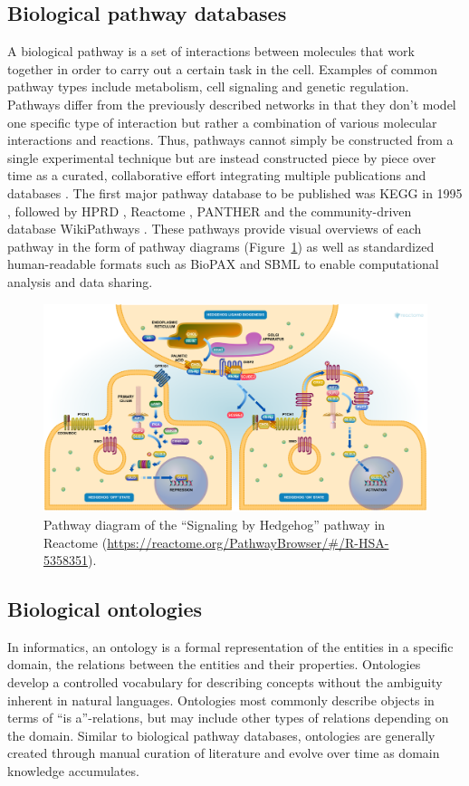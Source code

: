 \subsection{Biological pathway databases}
A biological pathway is a set of interactions between molecules that work together in order to carry out a certain task in the cell. Examples of common pathway types include metabolism, cell signaling and genetic regulation. Pathways differ from the previously described networks in that they don't model one specific type of interaction but rather a combination of various molecular interactions and reactions. Thus, pathways cannot simply be constructed from a single experimental technique but are instead constructed piece by piece over time as a curated, collaborative effort integrating multiple publications and databases \cite{Pico2008}. The first major pathway database to be published was KEGG in 1995 \cite{Kanehisa2000}, followed by HPRD \cite{Peri2003}, Reactome \cite{Joshi-Tope2004}, PANTHER \cite{Mi2009} and the community-driven database WikiPathways \cite{Pico2008}.
These pathways provide visual overviews of each pathway in the form of pathway diagrams (Figure~\ref{fig:reactome_hedgehog}) as well as standardized human-readable formats such as BioPAX \cite{Demir2010} and SBML \cite{Hucka2018} to enable computational analysis and data sharing.
%
\begin{figure}
    \centering
    \includegraphics[width=\linewidth]{figures/reactome_hedgehog.png}
    \caption{Pathway diagram of the \enquote{Signaling by Hedgehog} pathway in Reactome (\url{https://reactome.org/PathwayBrowser/\#/R-HSA-5358351}).}
    \label{fig:reactome_hedgehog}
\end{figure}

\subsection{Biological ontologies}
In informatics, an ontology is a formal representation of the entities in a specific domain, the relations between the entities and their properties. Ontologies develop a controlled vocabulary for describing concepts without the ambiguity inherent in natural languages. Ontologies most commonly describe objects in terms of \enquote{is a}-relations, but may include other types of relations depending on the domain. Similar to biological pathway databases, ontologies are generally created through manual curation of literature and evolve over time as domain knowledge accumulates.

